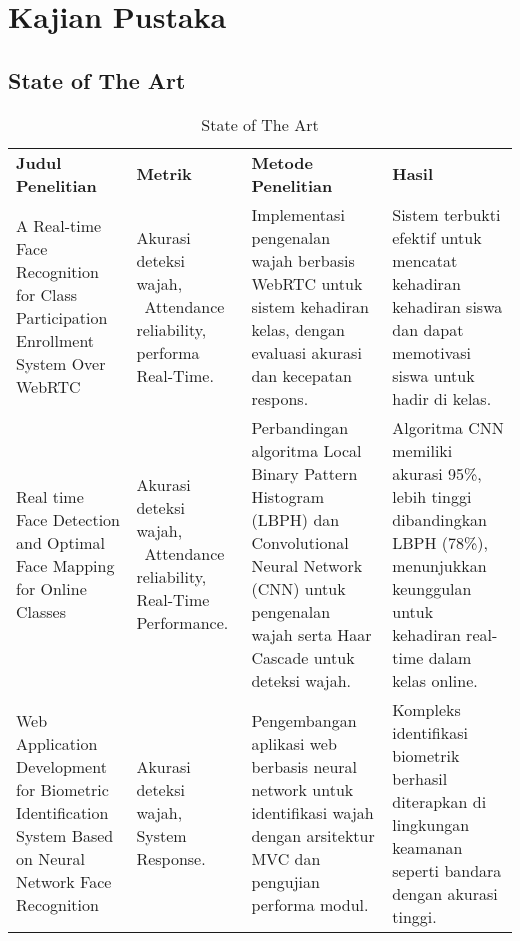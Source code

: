 \chapter{Kajian Pustaka}

\section{State of The Art}

\vspace{-1cm}
\begin{longtable}[t]
  {@{}
    |>{\raggedright\arraybackslash}p{}
    |>{\raggedright\arraybackslash}p{}
    |>{\raggedright\arraybackslash}p{}
    |>{\raggedright\arraybackslash}p{}|
  @{}}
  \endhead
  \endlastfoot

  \caption{State of The Art} \\

  \hline
  \textbf{Judul Penelitian} &
  \textbf{Metrik} &
  \textbf{Metode Penelitian} &
  \textbf{Hasil}

  \\ \hline
  {A Real-time Face Recognition for Class Participation Enrollment System Over WebRTC \parencite{phankokkruadRealtimeFaceRecognition2016}} &
  {Akurasi deteksi wajah, ~Attendance reliability, performa Real-Time.} &
  {Implementasi pengenalan wajah berbasis WebRTC untuk sistem kehadiran kelas, dengan evaluasi akurasi dan kecepatan respons.} &
  {Sistem terbukti efektif untuk mencatat kehadiran kehadiran siswa dan dapat memotivasi siswa untuk hadir di kelas.}

  \\ \hline
  {Real time Face Detection and Optimal Face Mapping for Online Classes \parencite{archanaRealTimeFace2022}} &
  {Akurasi deteksi wajah, ~Attendance reliability, Real-Time Performance.} &
  {Perbandingan algoritma Local Binary Pattern Histogram (LBPH) dan Convolutional Neural Network (CNN) untuk pengenalan wajah serta Haar Cascade untuk deteksi wajah.} &
  {Algoritma CNN memiliki akurasi 95\%, lebih tinggi dibandingkan LBPH (78\%), menunjukkan keunggulan untuk kehadiran real-time dalam kelas online.}

  \\ \hline
  {Web Application Development for Biometric Identification System Based on Neural Network Face Recognition \parencite{bykovWebApplicationDevelopment2020}} &
  {Akurasi deteksi wajah, System Response.} &
  {Pengembangan aplikasi web berbasis neural network untuk identifikasi wajah dengan arsitektur MVC dan pengujian performa modul.} &
  {Kompleks identifikasi biometrik berhasil diterapkan di lingkungan keamanan seperti bandara dengan akurasi tinggi.}


\end{longtable}
